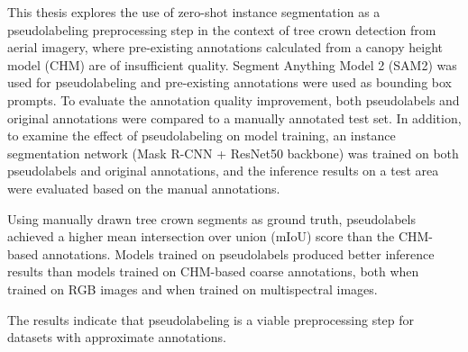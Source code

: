 \documentclass[english, 12pt, a4paper, sci, utf8, a-2b, online]{aaltothesis}
\date{30 September 2025}
\begin{document}
\makecoverpage

\makecopyrightpage

\clearpage

\begin{abstractpage}[english]

    This thesis explores the use of zero-shot instance segmentation as a pseudolabeling preprocessing step in the context of tree crown detection from aerial imagery, where pre-existing annotations calculated from a canopy height model (CHM) are of insufficient quality. Segment Anything Model 2 (SAM2) was used for pseudolabeling and pre-existing annotations were used as bounding box prompts. To evaluate the annotation quality improvement, both pseudolabels and original annotations were compared to a manually annotated test set. In addition, to examine the effect of pseudolabeling on model training, an instance segmentation network (Mask R-CNN + ResNet50 backbone) was trained on both pseudolabels and original annotations, and the inference results on a test area were evaluated based on the manual annotations.

    Using manually drawn tree crown segments as ground truth, pseudolabels achieved a higher mean intersection over union (mIoU) score than the CHM-based annotations. Models trained on pseudolabels produced better inference results than models trained on CHM-based coarse annotations, both when trained on RGB images and when trained on multispectral images.

    The results indicate that pseudolabeling is a viable preprocessing step for datasets with approximate annotations.

\end{abstractpage}
\end{document}
